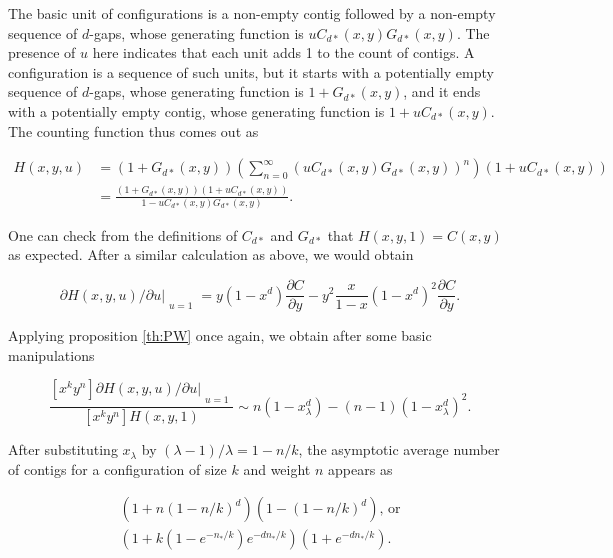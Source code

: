 \documentclass{article}
\begin{document}
The basic unit of configurations is a non-empty contig followed by a
non-empty sequence of $d$-gaps, whose generating function is
$uC_{d*}(x,y)G_{d*}(x,y)$. The presence of $u$ here indicates that each
unit adds 1 to the count of contigs. A configuration is a sequence of such
units, but it starts with a potentially empty sequence of $d$-gaps, whose
generating function is $1+G_{d*}(x,y)$, and it ends with a potentially
empty contig, whose generating function is $1+uC_{d*}(x,y)$. The counting
function thus comes out as

\begin{equation*}
\begin{split}
H(x,y,u) &= \left( 1+G_{d*}(x,y) \right)
\left( \sum_{n=0}^\infty (uC_{d*}(x,y)G_{d*}(x,y))^n \right)
\left( 1+uC_{d*}(x,y) \right) \\
& = \frac{(1+G_{d*}(x,y))(1+uC_{d*}(x,y))}{1-uC_{d*}(x,y)G_{d*}(x,y)}.
\end{split}
\end{equation*}

One can check from the definitions of $C_{d*}$ and $G_{d*}$ that $H(x,y,1)
= C(x,y)$ as expected. After a similar calculation as above, we would
obtain

\begin{equation*}
\partial H(x,y,u)/\partial u|_{\substack{\\u=1}}
= y(1-x^d) \frac{\partial C}{\partial y} - y^2\frac{x}{1-x}(1-x^d)^2
\frac{\partial C}{\partial y}.
\end{equation*}

Applying proposition \ref{th:PW} once again, we obtain after some basic
manipulations

\begin{equation}
\frac{[x^ky^n] \partial H(x,y,u)/\partial u|_{\substack{\\u=1}}}
{[x^ky^n]H(x,y,1)} \sim n(1-x_\lambda^d) - (n-1)(1-x_\lambda^d)^2.
\end{equation}

After substituting $x_\lambda$ by $(\lambda-1)/\lambda = 1-n/k$, the
asymptotic average number of contigs for a configuration of size $k$ and
weight $n$ appears as

\begin{equation}
\label{eq:avcont}
\begin{split}
\left( 1+n(1-n/k)^d \right) \left(1-(1-n/k)^d\right) \text{, or} \\
( 1 + k(1-e^{-n_*/k})e^{-dn_*/k} ) (1+e^{-dn_*/k}).
\end{split}
\end{equation}
\end{document}
